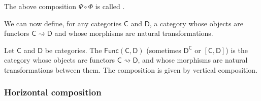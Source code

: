 \documentclass[notes.tex]{subfiles}
\begin{document}
\begin{definition}
  \label{def:verticalcomposition}
  The above composition $\Psi \circ \Phi$ is called .
\end{definition}

We can now define, for any categories $\mathsf{C}$ and $\mathsf{D}$, a category whose objects are functors $\mathsf{C} \rightsquigarrow \mathsf{D}$ and whose morphisms are natural transformations.

\begin{definition}
  \label{def:functorcategory}
  Let $\mathsf{C}$ and $\mathsf{D}$ be categories. The  $\mathsf{Func}(\mathsf{C}, \mathsf{D})$ (sometimes $\mathsf{D}^{\mathsf{C}}$ or $[\mathsf{C},\mathsf{D}]$) is the category whose objects are functors $\mathsf{C} \rightsquigarrow \mathsf{D}$, and whose morphisms are natural transformations between them. The composition is given by vertical composition.
\end{definition}


\subsubsection{Horizontal composition}
\end{document}
